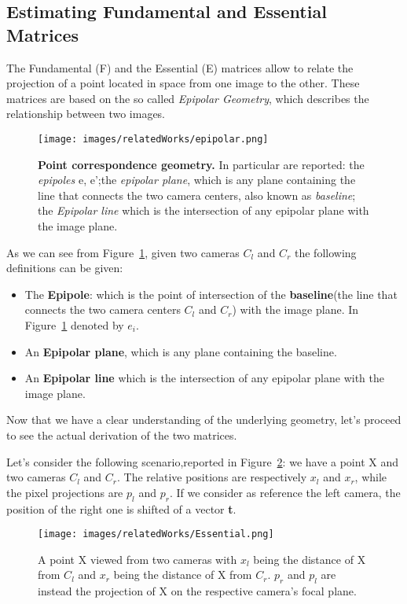  \subsection{Estimating Fundamental and Essential Matrices}
The Fundamental (F) and the Essential (E) matrices allow to relate the projection of a point located in space from one image to the other.
These matrices are based on the so called \textit{Epipolar Geometry}, which describes the relationship between two images.
\begin{figure}
    \centering
    \texttt{[image: images/relatedWorks/epipolar.png]} %
    \caption{\textbf{Point correspondence geometry.} In particular are reported: the \textit{epipoles} e, e';the \textit{epipolar plane}, which
    is any plane containing the line that connects the two camera centers, also known as \textit{baseline}; the \textit{Epipolar line} which 
    is the intersection of any epipolar plane with the image plane.}
    \label{fig:epipolar}
\end{figure}
As we can see from Figure~\ref{fig:epipolar}, given two cameras $C_l$ and $C_r$ the following definitions can be given:
\begin{itemize}
    \item The \textbf{Epipole}: which is the point of intersection of the \textbf{baseline}(the line that connects the two camera centers
    $C_l$ and $C_r$) with the image plane. In Figure~\ref{fig:epipolar} denoted by $e_i$.
    \item An \textbf{Epipolar plane}, which is any plane containing the baseline.
    \item An \textbf{Epipolar line} which is the intersection of any epipolar plane with the image plane.

\end{itemize}
Now that we have a clear understanding of the underlying geometry, let's proceed to see the actual derivation of the
two matrices.

Let's consider the following scenario,reported in Figure~\ref{fig:EstimateMatrices}: we have a point X and two cameras $C_l$ and $C_r$. 
The relative positions are respectively $x_l$ and $x_r$, while the pixel projections are $p_l$ and $p_r$.
If we consider as reference the left camera, the position of the right one is shifted of a vector \textbf{t}.

\begin{figure}
    \centering
    \texttt{[image: images/relatedWorks/Essential.png]} %
    \caption{A point X viewed from two cameras with $x_l$ being the distance of X from $C_l$ and $x_r$ being the distance of X from $C_r$.
    $p_r$ and $p_l$ are instead the projection of X on the respective camera's focal plane.}
    \label{fig:EstimateMatrices}
\end{figure}


